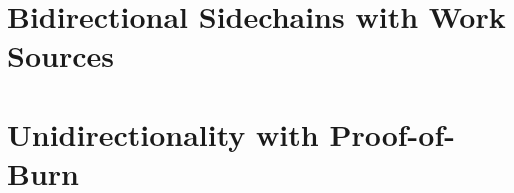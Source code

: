 






\section{Bidirectional Sidechains with Work Sources}\label{section:sidechains:work}





\section{Unidirectionality with Proof-of-Burn}\label{section:sidechains:burn}










